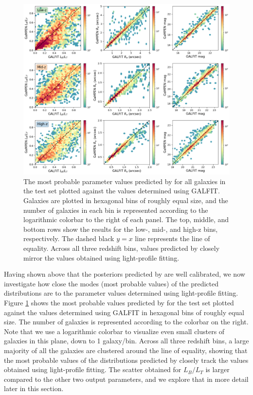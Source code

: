 \begin{figure}[htb]
    \centering
    \includegraphics[width = \textwidth]{pred_true_all_z.png}
    \caption{The most probable parameter values predicted by \gampen{} for all galaxies in the test set plotted against the values determined using GALFIT. Galaxies are plotted in hexagonal bins of roughly equal size, and the number of galaxies in each bin is represented according to the logarithmic colorbar to the right of each panel. The top, middle, and bottom rows show the results for the low-, mid-, and high-z bins, respectively. The dashed black $y=x$ line represents the line of equality. Across all three redshift bins, values predicted by \gampen{} closely mirror the values obtained using light-profile fitting.}
    \label{fig_c3:pred_true_all_z}
\end{figure}

Having shown above that the posteriors predicted by \gampen{} are well calibrated, we now investigate how close the modes (most probable values) of the predicted distributions are to the parameter values determined using light-profile fitting. Figure \ref{fig_c3:pred_true_all_z} shows the most probable values predicted by \gampen{} for the test set plotted against the values determined using GALFIT in hexagonal bins of roughly equal size. The number of galaxies is represented according to the colorbar on the right. Note that we use a logarithmic colorbar to visualize even small clusters of galaxies in this plane, down to 1 galaxy/bin. Across all three redshift bins, a large majority of all the galaxies are clustered around the line of equality, showing that the most probable values of the distributions predicted by \gampen{} closely track the values obtained using light-profile fitting. The scatter obtained for $L_B/L_T$ is larger compared to the other two output parameters, and we explore that in more detail later in this section.

